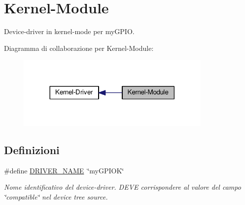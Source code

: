 \hypertarget{group___kernel-_module}{\section{Kernel-\/\+Module}
\label{group___kernel-_module}
}


Device-\/driver in kernel-\/mode per my\+G\+P\+I\+O.  


Diagramma di collaborazione per Kernel-\/\+Module\+:\nopagebreak
\begin{figure}[H]
\begin{center}
\leavevmode
\includegraphics[width=269pt]{group___kernel-_module}
\end{center}
\end{figure}
\subsection*{Definizioni}
\begin{DoxyCompactItemize}
\item 
\#define \hyperlink{group___kernel-_module_ga25634d21648ca7fb7a2aca614bafaaeb}{D\+R\+I\+V\+E\+R\+\_\+\+N\+A\+M\+E}~\char`\"{}my\+G\+P\+I\+O\+K\char`\"{}
\begin{DoxyCompactList}\small\item\em Nome identificativo del device-\/driver. D\+E\+V\+E corrispondere al valore del campo \char`\"{}compatible\char`\"{} nel device tree source. \end{DoxyCompactList}\end{DoxyCompactItemize}
